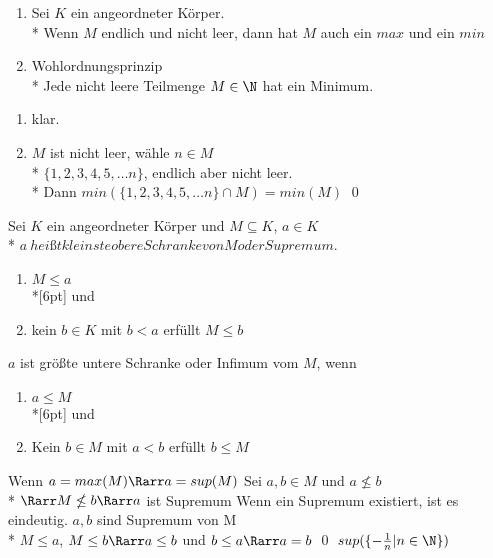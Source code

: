 	\begin{enumerate}
	\item{Sei $K$ ein angeordneter Körper.\\*
	Wenn $M$ endlich und nicht leer, dann hat $M$ auch ein $max$ und ein $min$}
	\item{Wohlordnungsprinzip\\*
	Jede nicht leere Teilmenge $M \in \N$ hat ein Minimum.}
	\end{enumerate}
\bew
	\begin{enumerate}
	\item{klar.}
	\item{$M$ ist nicht leer, wähle $n \in M$\\*
	$\{1, 2, 3, 4, 5, … n\}$, endlich aber nicht leer.\\*
	Dann $min(\{1, 2, 3, 4, 5, … n\} \cap M) = min(M)$ \qed}
	\end{enumerate}
	Sei $K$ ein angeordneter Körper und $M \subseteq K$, $a \in K$\\*
	$a \ heißt kleinste obere Schranke von M oder Supremum.$
	\begin{enumerate}
	\item{$M \leq a$}\\*[6pt]
	und
	\item{kein $b \in K$ mit $b < a$ erfüllt $M \leq b$}
	\end{enumerate}
	$a$ ist größte untere Schranke oder Infimum vom $M$, wenn
	\begin{enumerate}
	\item{$a \leq M$}\\*[6pt]
	und
	\item{Kein $b \in M$ mit $a < b$ erfüllt $b \leq M$}
	\end{enumerate}
\bem
	Wenn $a = max(M) \Rarr a = sup(M)$ 
\bew
	Sei $a, b \in M$ und $a \nleq b$\\*
	$\Rarr M \nleq b \Rarr a$ ist Supremum
\bem
	Wenn ein Supremum existiert, ist es eindeutig.
\bew
	$a, b$ sind Supremum von M\\*
	$M \leq a$, $M \leq b \Rarr a \leq b $ und $b \leq a \Rarr a = b$ \qed
\bsp
	$sup(\{ -\frac{1}{n} | n \in \N \})$